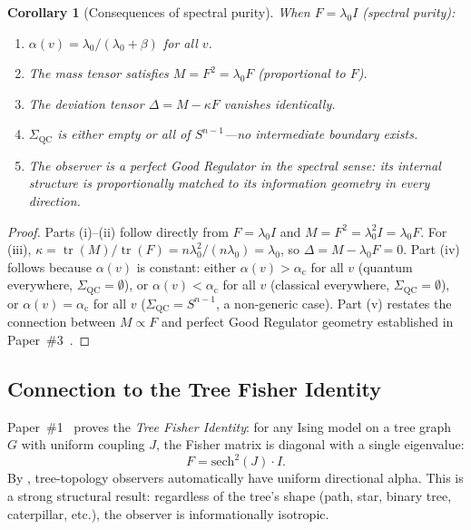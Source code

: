 \documentclass[11pt,a4paper]{article}
\theoremstyle{plain}
\newtheorem{corollary}[theorem]{Corollary}
\theoremstyle{definition}
\DeclareMathOperator{\tr}{tr}
\newcommand{\Sn}{S^{n-1}}
\newcommand{\SigmaQC}{\Sigma_{\mathrm{QC}}}
\newcommand{\alphac}{\alpha_{\mathrm{c}}}
\begin{document}
\begin{corollary}[Consequences of spectral purity]
\label{cor:spectral_purity}
When $F = \lambda_0 I$ (spectral purity):
\begin{enumerate}[label=(\roman*)]
\item $\alpha(v) = \lambda_0/(\lambda_0 + \beta)$ for all $v$.
\item The mass tensor satisfies $M = F^2 = \lambda_0 F$
  (proportional to $F$).
\item The deviation tensor $\Delta = M - \kappa F$ vanishes
  identically.
\item $\SigmaQC$ is either empty or all of $\Sn$---no intermediate
  boundary exists.
\item The observer is a perfect Good Regulator in the spectral
  sense: its internal structure is proportionally matched to its
  information geometry in every direction.
\end{enumerate}
\end{corollary}

\begin{proof}
Parts (i)--(ii) follow directly from $F = \lambda_0 I$ and
$M = F^2 = \lambda_0^2 I = \lambda_0 F$.  For (iii),
$\kappa = \tr(M)/\tr(F) = n\lambda_0^2/(n\lambda_0) = \lambda_0$,
so $\Delta = M - \lambda_0 F = 0$.  Part (iv) follows because
$\alpha(v)$ is constant: either $\alpha(v) > \alphac$ for all $v$
(quantum everywhere, $\SigmaQC = \emptyset$), or
$\alpha(v) < \alphac$ for all $v$ (classical everywhere,
$\SigmaQC = \emptyset$), or $\alpha(v) = \alphac$ for all $v$
($\SigmaQC = \Sn$, a non-generic case).
Part (v) restates the connection between $M \propto F$ and
perfect Good Regulator geometry established in
Paper~\#3~\cite{companion_amari}.
\end{proof}

\subsection{Connection to the Tree Fisher Identity}

Paper~\#1~\cite{companion_lovelock} proves the \emph{Tree Fisher
Identity}: for any Ising model on a tree graph $G$ with uniform
coupling $J$, the Fisher matrix is diagonal with a single
eigenvalue:
\[
F = \text{sech}^2(J) \cdot I.
\]
By , tree-topology observers automatically
have uniform directional alpha.  This is a strong structural
result: regardless of the tree's shape (path, star, binary tree,
caterpillar, etc.), the observer is informationally isotropic.
\end{document}
